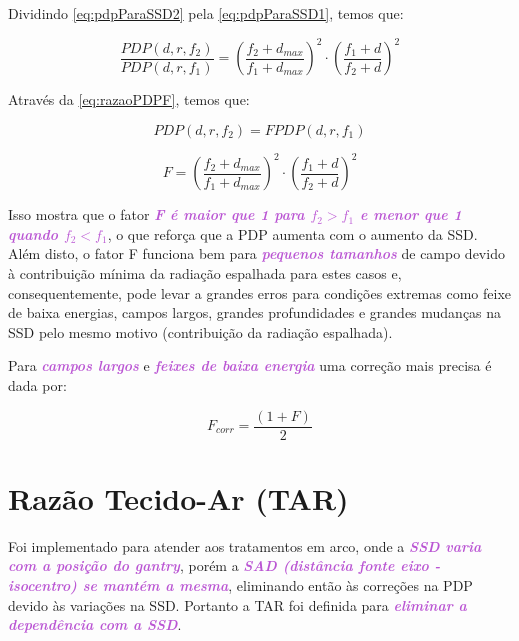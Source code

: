 \documentclass[11pt,a4paper]{article}
\newcounter{exemplo}
\begin{document}
	Dividindo \ref{eq:pdpParaSSD2} pela \ref{eq:pdpParaSSD1}, temos que:

	\begin{equation}
		\frac{PDP(d, r, f_2)}{PDP(d, r, f_1)} = \left(\frac{f_2 + d_{max}}{f_1 + d_{max}}\right)^2 \cdot \left(\frac{f_1 + d}{f_2 + d}\right)^2
		\label{eq:razaoPDPF}
	\end{equation}

	Através da \ref{eq:razaoPDPF}, temos que:

		$$PDP(d, r, f_2) = F PDP(d, r, f_1)$$

	\begin{exemplo}
		\begin{equation}
			F = \left(\frac{f_2 + d_{max}}{f_1 + d_{max}}\right)^2 \cdot \left(\frac{f_1 + d}{f_2 + d}\right)^2
			\label{eq:fatorF}
		\end{equation}
	\end{exemplo}


	Isso mostra que o fator \textcolor{MediumOrchid}{\textbf{\textit{F é maior que 1 para $f_2 > f_1$ e menor que 1 quando $f_2 < f_1$}}}, o que reforça que a PDP aumenta com o aumento da SSD. Além disto, o fator F funciona bem para \textcolor{MediumOrchid}{\textbf{\textit{pequenos tamanhos}}} de campo devido à contribuição mínima da radiação espalhada para estes casos e, consequentemente, pode levar a grandes erros para condições extremas como feixe de baixa energias, campos largos, grandes profundidades e grandes mudanças na SSD pelo mesmo motivo (contribuição da radiação espalhada). 

	Para \textcolor{MediumOrchid}{\textbf{\textit{campos largos}}} e \textcolor{MediumOrchid}{\textbf{\textit{feixes de baixa energia}}} uma correção mais precisa é dada por:

		\begin{equation}
			F_{corr} = \frac{(1 + F)}{2}
		\end{equation}

\section{Razão Tecido-Ar (TAR)}

	Foi implementado para atender aos tratamentos em arco, onde a \textcolor{MediumOrchid}{\textbf{\textit{SSD varia com a posição do gantry}}}, porém a \textcolor{MediumOrchid}{\textbf{\textit{SAD (distância fonte eixo - isocentro) se mantém a mesma}}}, eliminando então às correções na PDP devido às variações na SSD. Portanto a TAR foi definida para \textcolor{MediumOrchid}{\textbf{\textit{eliminar a dependência com a SSD}}}. 
\end{document}
